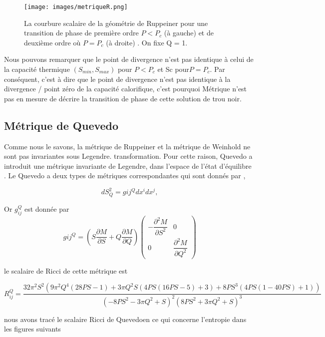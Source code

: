 \documentclass[12pt,  a4paper, openright]{report} %
\begin{document}
\begin{figure}[H]
\texttt{[image: images/metriqueR.png]}
\caption{La courbure scalaire de la géométrie de Ruppeiner pour une transition de phase
	de première ordre $P < P_{c}$ (à gauche) et de deuxième ordre où $P = P_{c}$ (à droite) . On fixe Q = 1.}
\end{figure} 

Nous pouvons remarquer que le point de divergence n’est pas identique à celui de la
capacité thermique $(S_{min}, S_{max})$ pour $P < P_{c}$ et Sc pour$ P = P_{c}$. Par conséquent,
c'est à dire 
que le point de divergence n'est pas identique à la divergence / point zéro de la capacité calorifique, c'est pourquoi
Métrique n'est pas en mesure de décrire la transition de phase de cette solution de trou noir.
\subsection{Métrique de Quevedo}
Comme nous le savons, la métrique de Ruppeiner et la métrique de Weinhold ne sont pas invariantes sous Legendre.
transformation. Pour cette raison, Quevedo a introduit une métrique invariante de Legendre,
dans l'espace de l'état d'équilibre \cite{54}. Le Quevedo a deux types de métriques correspondantes
qui sont donnés par \cite{55},

\begin{equation}
dS_{Q}^{2}=g{ij}^{Q}dx^{i}dx^{j},
\end{equation}

Or $g_{ij}^{Q}$ est donnée par 
\begin{equation}
g{ij}^{Q}=\left( S\dfrac{\partial M}{\partial S}+Q\dfrac{\partial M}{\partial Q}\right)
\begin{pmatrix}
 -\dfrac{\partial^{2}M}{\partial S^{2}}  & 0\\
  0                                     & \dfrac{\partial^{2}M}{\partial Q^{2}}                  
\end{pmatrix}
\end{equation}

le scalaire de Ricci de cette métrique est

\begin{equation}
R_{ij}^{Q}=\dfrac{32\pi^{2} S^{2}\left(9\pi^{2}Q^{4}(28PS-1)+3\pi Q^{2}S(4PS(16PS-5)+3)+8PS^{3}(4PS(1-40PS)+1) \right) }{\left(-8PS^{2}-3\pi Q^{2}+S \right)^{2}\left(8PS^{2}+3\pi Q^{2}+S \right)^{3}  }
\end{equation}

nous avons tracé le scalaire  Ricci  de Quevedoen ce qui concerne l'entropie dans les figures suivants \\
\end{document}
